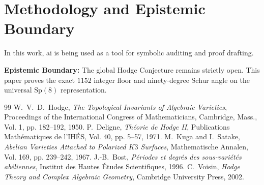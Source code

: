 \documentclass[11pt,a4paper]{article}
\theoremstyle{definition}
\begin{document}
\section{Methodology and Epistemic Boundary}

In this work, ai is being used as a tool for symbolic auditing and proof drafting. 

\textbf{Epistemic Boundary:} The global Hodge Conjecture remains strictly open. This paper proves the exact $1152$ integer floor and ninety-degree Schur angle on the universal $\mathrm{Sp}(8)$ representation.


\begin{thebibliography}{99}
 W.~V.~D.~Hodge, \emph{The Topological Invariants of Algebraic Varieties}, Proceedings of the International Congress of Mathematicians, Cambridge, Mass., Vol. 1, pp. 182--192, 1950.
 P.~Deligne, \emph{Th\'eorie de Hodge II}, Publications Math\'ematiques de l'IH\'ES, Vol. 40, pp. 5--57, 1971.
 M.~Kuga and I.~Satake, \emph{Abelian Varieties Attached to Polarized $K3$ Surfaces}, Mathematische Annalen, Vol. 169, pp. 239--242, 1967.
 J.-B.~Bost, \emph{P\'eriodes et degr\'es des sous-vari\'et\'es ab\'eliennes}, Institut des Hautes \'Etudes Scientifiques, 1996.
 C.~Voisin, \emph{Hodge Theory and Complex Algebraic Geometry}, Cambridge University Press, 2002.
\end{thebibliography}
\end{document}
